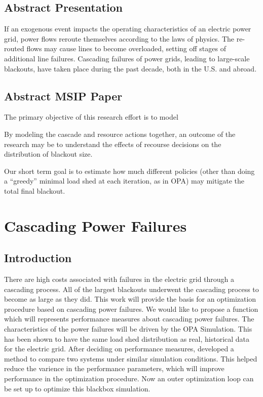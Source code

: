\section{Abstract Presentation}
If an exogenous event impacts the operating characteristics of an
electric power grid, power flows reroute themselves according to the
laws of physics.  The re-routed flows may cause lines to become
overloaded, setting off stages of additional line failures.
Cascading failures of power grids, leading to large-scale
blackouts, have taken place during the past decade, both in the
U.S. and abroad.  

\section{Abstract MSIP Paper}
The primary objective of this research effort is to model 

By modeling the cascade and resource actions together, an outcome of
the research may be to understand the effects of recourse decisions on
the distribution of blackout size.




Our short term goal is to estimate how much different policies (other
than doing a ``greedy'' minimal load shed at each iteration, as in
OPA) may mitigate the total final blackout.




\chapter{Cascading Power Failures}




\section{Introduction}
There are high costs associated with failures in the electric grid through a cascading process.  All of the largest blackouts underwent the cascading process to become as large as they did.  This work will provide the basis for an optimization procedure based on cascading power failures. We would like to propose a function which will represents performance measures about cascading power failures.  The characteristics of the power failures will be driven by the OPA Simulation.  This has been shown to have the same load shed distribution as real, historical data for the electric grid.  After deciding on performance measures, developed a method to compare two systems under similar simulation conditions.  This helped reduce the varience in the performance parameters, which will improve performance in the optimization procedure. Now an outer optimization loop can be set up to optimize this blackbox simulation.
